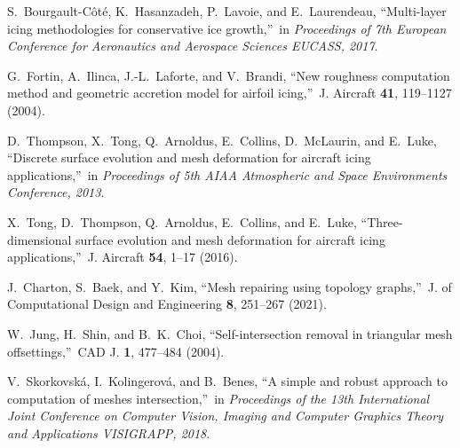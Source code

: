 \documentclass[
11pt,%
tightenlines,%
twoside,%
onecolumn,%
nofloats,%
nobibnotes,%
nofootinbib,%
superscriptaddress,%
noshowpacs,%
centertags]%
{revtex4}
\begin{document}
\begin{thebibliography}{99}

S.~Bourgault-C\^ot\'e, K.~Hasanzadeh, P.~Lavoie, and E.~Laurendeau, \textquotedblleft Multi-layer icing methodologies for conservative ice growth,\textquotedblright \ in \textit{Proceedings of 7th European Conference for Aeronautics and Aerospace Sciences EUCASS, 2017}.

G.~Fortin, A.~Ilinca, J.-L.~Laforte, and V.~Brandi, \textquotedblleft New roughness computation method and geometric accretion model for airfoil icing,\textquotedblright \ J. Aircraft \textbf{41}, 119--1127 (2004).

D.~Thompson, X.~Tong, Q.~Arnoldus, E.~Collins, D.~McLaurin, and E.~Luke, \textquotedblleft Discrete surface evolution and mesh deformation for aircraft icing applications,\textquotedblright \ in \textit{Proceedings of 5th AIAA Atmospheric and Space Environments Conference, 2013}.

X.~Tong, D.~Thompson, Q.~Arnoldus, E.~Collins, and E.~Luke, \textquotedblleft Three-dimensional surface evolution and mesh deformation for aircraft icing applications,\textquotedblright \ J. Aircraft \textbf{54}, 1--17 (2016).


J.~Charton, S.~Baek, and Y.~Kim, \textquotedblleft Mesh repairing using topology graphs,\textquotedblright \ J. of Computational Design and Engineering \textbf{8}, 251--267 (2021).

W.~Jung, H.~Shin, and B.~K.~Choi, \textquotedblleft Self-intersection removal in triangular mesh offsettings,\textquotedblright \ CAD J. \textbf{1}, 477--484 (2004).

V.~Skorkovsk\'a, I.~Kolingerov\'a, and B.~Benes, \textquotedblleft A simple and robust approach to computation of meshes intersection,\textquotedblright \ in \textit{Proceedings of the 13th International Joint Conference on Computer Vision, Imaging and Computer Graphics Theory and Applications VISIGRAPP, 2018}.

\end{thebibliography}
\end{document}
